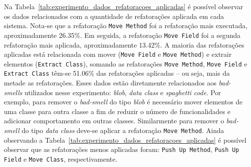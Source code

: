 Na Tabela~\ref{tab:experimento_dados_refatoracoes_aplicadas} é possível observar os dados relacionados com a quantidade de refatorações aplicada em cada sistema. Nota-se que a refatoração \texttt{Move Method} foi a refatoração mais executada, aproximadamente 26.35\%.  Em seguida, a refatoração \texttt{Move Field} foi a segunda refatoração mais aplicada, aproximadamente 13.42\%. A maioria das refatorações aplicadas está relacionada com mover (\texttt{Move Field} e \texttt{Move Method}) e extrair elementos (\texttt{Extract Class}), somando as refatorações \texttt{Move Method}, \texttt{Move Field} e \texttt{Extract Class} têm-se 51.06\% das refatorações aplicadas – ou seja, mais da metade as refatorações. Esses dados estão diretamente relacionados aos \textit{bad-smells} utilizados nesse experimento: \textit{blob}, \textit{data class} e \textit{spaghetti code}. Por exemplo, para remover o \textit{bad-smell} do tipo \textit{blob} é necessário mover elementos de uma classe para outra classe a fim de reduzir o número de funcionalidades e adicionar comportamento em outras classes. Similarmente para remover o \textit{bad-smell} do tipo \textit{data class} deve-se aplicar a refatoração \texttt{Move Method}. Ainda observando a Tabela~\ref{tab:experimento_dados_refatoracoes_aplicadas} é possível observar que as refatorações menos aplicadas foram: \texttt{Push Up Method}, \texttt{Push Up Field} e \texttt{Move Class}, respectivamente. 

